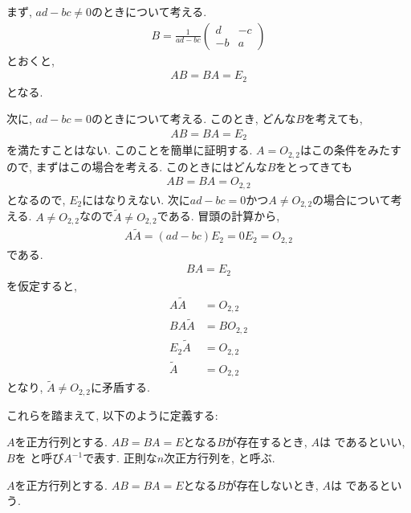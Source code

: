 まず, $ad-bc\neq 0$のときについて考える.
\begin{align*}
  B=\frac{1}{ad-bc}
  \begin{pmatrix}
    d&-c\\-b&a
  \end{pmatrix}
\end{align*}
とおくと,
\begin{align*}
  AB=BA=E_2
\end{align*}
となる.


次に, $ad-bc= 0$のときについて考える.
このとき, どんな$B$を考えても,
\begin{align*}
  AB=BA=E_2
\end{align*}
を満たすことはない.
このことを簡単に証明する.
$A=O_{2,2}$はこの条件をみたすので,
まずはこの場合を考える.
このときにはどんな$B$をとってきても
\begin{align*}
  AB=BA=O_{2,2}
\end{align*}
となるので, $E_2$にはなりえない.
次に$ad-bc= 0$かつ$A\neq O_{2,2}$の場合について考える.
$A\neq O_{2,2}$なので$\tilde A \neq O_{2,2}$である.
冒頭の計算から,
\begin{align*}
  A\tilde A=(ad-bc)E_2=0E_2=O_{2,2}
\end{align*}
である.
\begin{align*}
  BA=E_2
\end{align*}
を仮定すると,
\begin{align*}
  A\tilde A&=O_{2,2}\\
  BA\tilde A&=BO_{2,2}\\
  E_2\tilde A&=O_{2,2}\\
  \tilde A&=O_{2,2}
\end{align*}
となり, $\tilde A\neq O_{2,2}$に矛盾する.


これらを踏まえて,
以下のように定義する:
\begin{definition}
  \label{def:mat:reg}
  $A$を正方行列とする.
  $AB=BA=E$となる$B$が存在するとき,
  $A$は
  であるといい,
  $B$を
  と呼び$A^{-1}$で表す.
  正則な$n$次正方行列を,
  と呼ぶ.
\end{definition}
\begin{definition}
  $A$を正方行列とする.
  $AB=BA=E$となる$B$が存在しないとき,
  $A$は
  であるという.
\end{definition}

